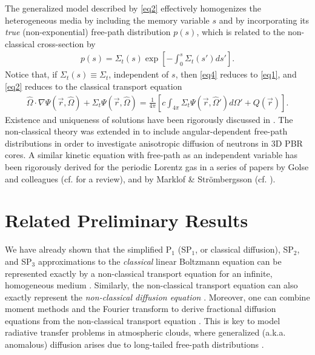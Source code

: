 \documentclass[12pt]{article}
\newcommand{\rvec}{\ensuremath{\vec{r}}}
\newcommand{\omvec}{\ensuremath{\hat{\Omega}}}
\begin{document}
The generalized model described by \cref{eq2} effectively homogenizes the heterogeneous media by including the memory variable $s$ and by incorporating its \textit{true} (non-exponential) free-path distribution $p(s)$, which is related to the non-classical cross-section by \cite{larvas11}
\begin{align}\label{eq4}
p(s) = \Sigma_t(s)\exp\left[-\int_0^s\Sigma_t(s')ds'\right].
\end{align}
Notice that, if $\Sigma_t(s)\equiv\Sigma_t$, independent of $s$, then \cref{eq4} reduces to \cref{eq1}, and \cref{eq2} reduces to the classical transport equation
\begin{align}\label{eq5}
\omvec\cdot\nabla\Psi(\rvec,\omvec) + \Sigma_t\Psi(\rvec,\omvec)
= \frac{1}{4\pi}\left[c\int_{4\pi} \Sigma_t\Psi(\rvec,\omvec')d\Omega' + Q(\rvec)\right].\nonumber
\end{align}
Existence and uniqueness of solutions have been rigorously discussed in \cite{fragou10}.
The non-classical theory was extended in \cite{vaslar14a} to include angular-dependent free-path distributions in order to investigate anisotropic diffusion of neutrons in 3D PBR cores.
A similar kinetic equation with free-path as an independent variable has been rigorously derived for the periodic Lorentz gas in a series of papers by Golse and colleagues (cf. \cite{gol12} for a review), and by Marklof \& Str\"ombergsson (cf. \cite{marstr11,marstr15}).

\section{Related Preliminary Results}

We have already shown that the simplified P$_1$ (SP$_1$, or classical diffusion), SP$_2$, and SP$_3$ approximations to the \textit{classical} linear Boltzmann equation can be represented exactly by a non-classical transport equation for an infinite, homogeneous medium \cite{frakry15}.
Similarly, the non-classical transport equation can also exactly represent the  \textit{non-classical diffusion equation} \cite{vas16}.
Moreover, one can combine moment methods and the Fourier transform to derive fractional diffusion equations from the non-classical transport equation \cite{frasun16}.
This is key to model radiative transfer problems in atmospheric clouds, where generalized (a.k.a. anomalous) diffusion arises due to long-tailed free-path distributions \cite{davmar97,schetal06}.
\end{document}
